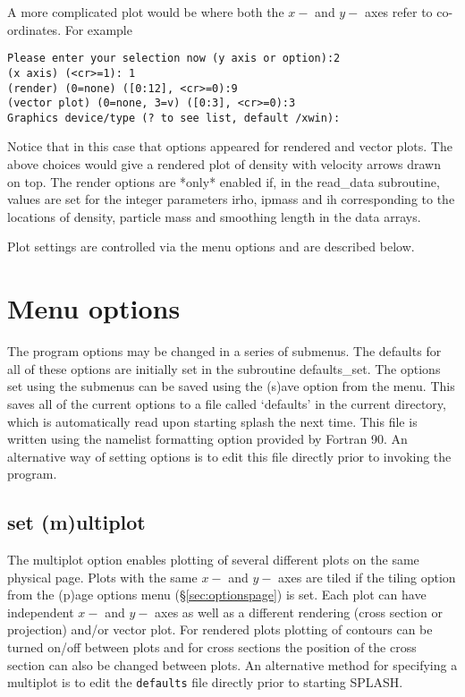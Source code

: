 \documentclass[a4paper,11pt]{article}
\begin{document}
A more complicated plot would be where both the $x-$ and $y-$ axes refer to co-ordinates. For example
\begin{verbatim}
Please enter your selection now (y axis or option):2
(x axis) (<cr>=1): 1
(render) (0=none) ([0:12], <cr>=0):9
(vector plot) (0=none, 3=v) ([0:3], <cr>=0):3
Graphics device/type (? to see list, default /xwin): 
\end{verbatim}
Notice that in this case that options appeared for rendered and vector plots. The above choices
would give a rendered plot of density with velocity arrows drawn on top. The render options are
*only* enabled if, in the read\_data subroutine, values are set for the integer parameters irho, ipmass and ih
corresponding to the locations of density, particle mass and smoothing length in the data arrays.

 Plot settings are controlled via the menu options and are described below. 

\section{Menu options}
 The program options may be changed in a series of submenus. The defaults for all of
these options are initially set in the subroutine defaults\_set. The options set using
the submenus can be saved using the (s)ave option from the menu. This saves all of
the current options to a file called `defaults' in the current directory, which is
automatically read upon starting splash the next time. This file is written using
the namelist formatting option provided by Fortran 90. An alternative way of setting
options is to edit this file directly prior to invoking the program.

\subsection{set (m)ultiplot}
 The multiplot option enables plotting of several different plots on the same
physical page. Plots with the same $x-$ and $y-$ axes are tiled if the tiling
option from the (p)age options menu (\S\vref{sec:optionspage}) is set. Each plot
can have independent $x-$ and $y-$ axes as well as a different rendering (cross
section or projection) and/or vector plot. For rendered plots plotting of
contours can be turned on/off between plots and for cross sections the position of
the cross section can also be changed between plots. An alternative method for
specifying a multiplot is to edit the \verb+defaults+ file directly prior to
starting SPLASH.
\end{document}
